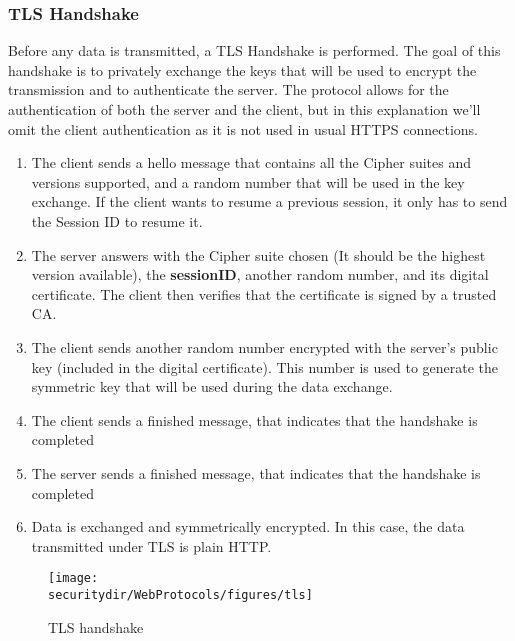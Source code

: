 \subsubsection{TLS Handshake}
Before any data is transmitted, a TLS Handshake is performed. The goal of this handshake is to privately exchange the keys that will be used to encrypt the transmission and to authenticate the server. The protocol allows for the authentication of both the server and the client, but in this explanation we'll omit the client authentication as it is not used in usual HTTPS connections. 
\begin{enumerate}
\item The client sends a hello message that contains all the Cipher suites and versions supported, and a random number that will be used in the key exchange. If the client wants to resume a previous session, it only has to send the Session ID to resume it.

\item The server answers with the Cipher suite chosen (It should be the highest version available), the \textbf{sessionID}, another random number, and its digital certificate. The client then verifies that the certificate is signed by a trusted CA.

\item The client sends another random number encrypted with the server's public key (included in the digital certificate). This number is used to generate the symmetric key that will be used during the data exchange.

\item The client sends a finished message, that indicates that the handshake is completed

\item The server sends a finished message, that indicates that the handshake is completed

\item Data is exchanged and symmetrically encrypted. In this case, the data transmitted under TLS is plain HTTP.
\end{enumerate}

\begin{figure}[htb]
	\begin{centering}
		\texttt{[image: \\securitydir/WebProtocols/figures/tls]}
		\par
	\end{centering}
	\caption{\label{fig:tls} TLS handshake}
\end{figure}



